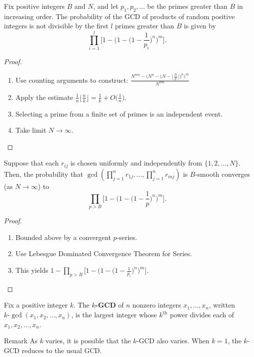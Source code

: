 \documentclass[11pt,xcolor={dvipsnames}]{beamer}
\begin{document}
	\begin{frame}
		\begin{theorem}
			Fix positive integers $B$ and $N$, and let $p_1, p_2, ...$ be the primes greater than $B$ in increasing order. The probability of the GCD of products of random positive integers is not divisible by the first $l$ primes greater than $B$ is given by
			$$\prod_{i=1}^{l} \Big[1 - \Big(1 - \Big(1-\frac{1}{p_i}\Big)^n\Big)^m\Big].$$
		\end{theorem}
			\begin{proof}
		\begin{enumerate}
			\item Use counting arguments to construct:
			$\frac{N^{mn} - \Big(N^n - \Big(N - \Big\lfloor\frac{N}{p}\Big\rfloor\Big)^n\Big)^m}{N^{mn}}$
			\item Apply the estimate $\frac{1}{n} \Big\lfloor \frac{n}{k} \Big\rfloor = \frac{1}{k} + O\Big(\frac{1}{n}\Big)$.
			\item Selecting a prime from a finite set of primes is an independent event.
			\item Take limit $N \to \infty$. 
		\end{enumerate}
		\end{proof}
	\end{frame}

	\begin{frame}
		\begin{theorem}
			Suppose that each $r_{ij}$ is chosen uniformly and independently from $\{1, 2, ..., N\}$. Then, the probability that $\gcd(\prod_{j=1}^n r_{1j}, ... , \prod_{j=1}^n r_{mj})$ is $B$-smooth converges (as $N \to \infty$) to
			$$\prod_{p>B} \Big[1 - \Big(1 - \Big(1 - \frac{1}{p}\Big)^n \Big)^m \Big].$$
		\end{theorem}
		\begin{proof}
			\begin{enumerate}
				\item Bounded above by a convergent $p$-series.
                \item Use Lebesgue Dominated Convergence Theorem for Series.
				\item This yields $ 1 - \prod_{p > B} \Big[1 - \Big(1 - \Big(1 - \frac{1}{p_i}  \Big)^n\Big)^m\Big].$
			\end{enumerate}
		\end{proof}
	\end{frame}

	\begin{frame}
		\begin{definition}[$k$-GCD] Fix a positive integer $k$. The \textbf{$k$-GCD} of $n$ nonzero integers $x_1, ..., x_n$, written $k\text{-}\gcd(x_1,x_2, ...,x_n)$, is the largest integer whose $k^{\text{th}}$ power divides each of $x_1, x_2, ..., x_n$.
		\end{definition}	
		
		\begin{alertblock}{Remark}
			As $k$ varies, it is possible that the $k$-GCD also varies.\newline
                When $k=1$, the $k$-GCD reduces to the usual GCD. 
		\end{alertblock}
	\end{frame}
\end{document}

